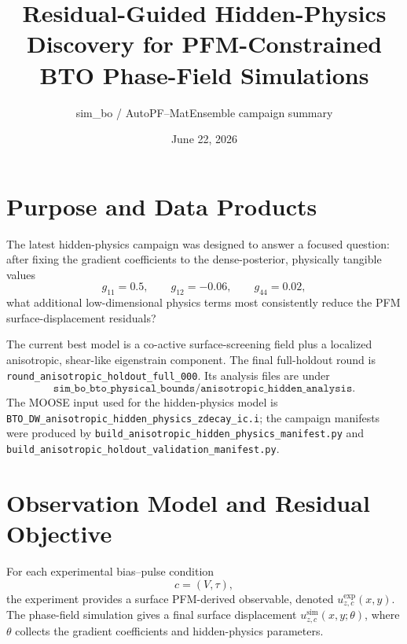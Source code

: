 \documentclass[11pt]{article}
\title{Residual-Guided Hidden-Physics Discovery for PFM-Constrained BTO Phase-Field Simulations}
\author{sim\_bo / AutoPF--MatEnsemble campaign summary}
\date{June 22, 2026}
\newcommand{\Uzc}[2]{u_{z,#2}^{#1}}
\begin{document}
\maketitle

\section{Purpose and Data Products}

The latest hidden-physics campaign was designed to answer a focused question:
after fixing the gradient coefficients to the dense-posterior, physically
tangible values
\[
  g_{11}=0.5,\qquad g_{12}=-0.06,\qquad g_{44}=0.02,
\]
what additional low-dimensional physics terms most consistently reduce the
PFM surface-displacement residuals?

The current best model is a co-active surface-screening field plus a localized
anisotropic, shear-like eigenstrain component.  The final full-holdout round is
\texttt{round\_anisotropic\_holdout\_full\_000}.  Its analysis files are under
\[
\texttt{sim\_bo\_bto\_physical\_bounds/anisotropic\_hidden\_analysis}.
\]
The MOOSE input used for the hidden-physics model is
\texttt{BTO\_DW\_anisotropic\_hidden\_physics\_zdecay\_ic.i}; the campaign
manifests were produced by
\texttt{build\_anisotropic\_hidden\_physics\_manifest.py} and
\texttt{build\_anisotropic\_holdout\_validation\_manifest.py}.

\section{Observation Model and Residual Objective}

For each experimental bias--pulse condition
\[
  c=(V,\tau),
\]
the experiment provides a surface PFM-derived observable, denoted
\(\Uzc{\mathrm{exp}}{c}(x,y)\).  The phase-field simulation gives a final
surface displacement \(\Uzc{\mathrm{sim}}{c}(x,y;\theta)\), where \(\theta\)
collects the gradient coefficients and hidden-physics parameters.
\end{document}
